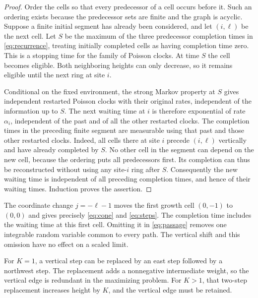 \documentclass[11pt]{amsart}
\theoremstyle{remark}
\numberwithin{equation}{section}
\begin{document}
\begin{proof}
Order the cells so that every predecessor of a cell occurs before it.
Such an ordering exists because the predecessor sets are finite and
the graph is acyclic. Suppose a finite initial segment has already
been considered, and let $(i,\ell)$ be the next cell. Let $S$ be the
maximum of the three predecessor completion times in
\eqref{eq:recurrence}, treating initially completed cells as having
completion time zero. This is a stopping time for the family of
Poisson clocks. At time $S$ the cell becomes eligible. Both neighboring
heights can only decrease, so it remains eligible until the next ring
at site $i$.

Conditional on the fixed environment, the strong Markov property at
$S$ gives independent restarted Poisson clocks with their original
rates, independent of the information up to $S$. The next waiting
time at $i$ is therefore exponential of rate $\alpha_i$, independent
of the past and of all the other restarted clocks. The completion
times in the preceding finite segment are measurable using that
past and those other restarted clocks. Indeed, all cells there at
site $i$ precede $(i,\ell)$ vertically and have already completed
by $S$. No other cell in the segment can depend on the new cell,
because the ordering puts all predecessors first. Its completion
can thus be reconstructed without using any site-$i$ ring after $S$.
Consequently the new waiting time is independent of all preceding
completion times, and hence of their waiting times. Induction proves
the assertion.
\end{proof}

The coordinate change $j=-\ell-1$ moves the first growth cell
$(0,-1)$ to $(0,0)$ and gives precisely \eqref{eq:cone} and
\eqref{eq:steps}. The completion time includes the waiting time at
this first cell. Omitting it in \eqref{eq:passage} removes one
integrable random variable common to every path. The vertical shift
and this omission have no effect on a scaled limit.

For $K=1$, a vertical step can be replaced by an east step followed by
a northwest step. The replacement adds a nonnegative intermediate
weight, so the vertical edge is redundant in the maximizing problem.
For $K>1$, that two-step replacement increases height by $K$, and the
vertical edge must be retained.
\end{document}
